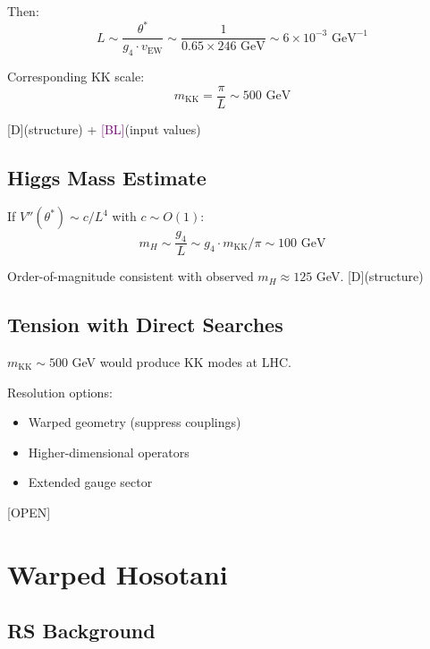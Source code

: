 \documentclass[11pt,a4paper]{article}
\newcommand{\tagD}{\textcolor{blue!70!black}{[D]}}
\newcommand{\tagBL}{\textcolor{purple}{[BL]}}
\newcommand{\tagOPEN}{\textcolor{red!70!black}{[OPEN]}}
\begin{document}
Then:
\begin{equation}
\label{eq:L-estimate}
L \sim \frac{\theta^*}{g_4 \cdot v_{\text{EW}}} \sim \frac{1}{0.65 \times 246 \text{ GeV}} \sim 6 \times 10^{-3} \text{ GeV}^{-1}
\end{equation}

Corresponding KK scale:
\begin{equation}
\label{eq:kk-estimate}
m_{\text{KK}} = \frac{\pi}{L} \sim 500 \text{ GeV}
\end{equation}

\tagD (structure) + \tagBL (input values)

\subsection{Higgs Mass Estimate}

If $V''(\theta^*) \sim c/L^4$ with $c \sim O(1)$:
\begin{equation}
\label{eq:mH-estimate}
m_H \sim \frac{g_4}{L} \sim g_4 \cdot m_{\text{KK}} / \pi \sim 100 \text{ GeV}
\end{equation}

Order-of-magnitude consistent with observed $m_H \approx 125$ GeV. \tagD (structure)

\subsection{Tension with Direct Searches}

$m_{\text{KK}} \sim 500$ GeV would produce KK modes at LHC.

Resolution options:
\begin{itemize}
    \item Warped geometry (suppress couplings)
    \item Higher-dimensional operators
    \item Extended gauge sector
\end{itemize}

\tagOPEN

\section{Warped Hosotani}

\subsection{RS Background}
\end{document}

